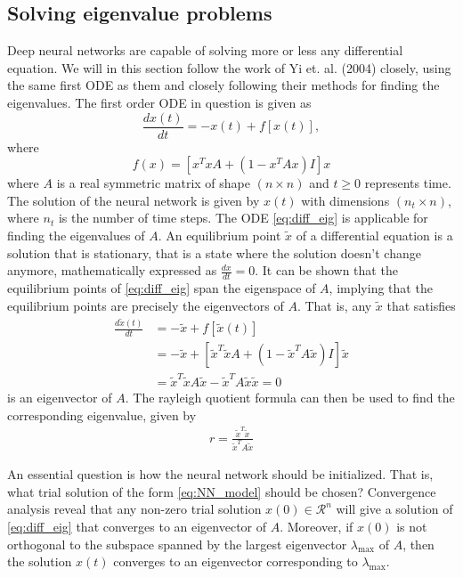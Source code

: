 \documentclass[12pt]{extarticle}
\begin{document}
\subsection{Solving eigenvalue problems}
Deep neural networks are capable of solving more or less any differential equation. We will in this section follow the work of Yi et. al. (2004) \cite{yi2004neural} closely, using the same first ODE as them and closely following their methods for finding the eigenvalues. The first order ODE in question is given as     
\begin{equation}
	\frac{dx(t)}{dt} = -x(t) + f[x(t)],
	\label{eq:diff_eig}
\end{equation}
where
\[ f(x) = [x^TxA + (1 - x^TAx)I]x \]
where $A$ is a real symmetric matrix of shape $(n\times n)$ and $t \ge 0$ represents time. The solution of the neural network is given by $x(t)$ with dimensions $(n_t\times n)$, where $n_t$ is the number of time steps. The ODE \eqref{eq:diff_eig} is applicable for finding the eigenvalues of $A$. An equilibrium point $\tilde{x}$ of a differential equation is a solution that is stationary, that is a state where the solution doesn't change anymore, mathematically expressed as $\frac{dx}{dt} = 0$. It can be shown that the equilibrium points of \eqref{eq:diff_eig} span the eigenspace of $A$, implying that the equilibrium points are precisely the eigenvectors of $A$. That is, any $\tilde{x}$ that satisfies
\begin{align*}
	\frac{d\tilde{x}(t)}{dt} &= -\tilde{x} + f[\tilde{x}(t)] \\
	&= -\tilde{x} + [\tilde{x}^T\tilde{x}A + (1 - \tilde{x}^TA\tilde{x})I]\tilde{x} \\
	&= \tilde{x}^T\tilde{x}A\tilde{x} - \tilde{x}^TA\tilde{x}\tilde{x} = 0
\end{align*}
is an eigenvector of $A$. The rayleigh quotient formula can then be used to find the corresponding eigenvalue, given by
\begin{align} \label{eq:rayleigh_quotient}
	r = \frac{\tilde{x}^T\tilde{x}}{\tilde{x}^T A \tilde{x}}
\end{align}

An essential question is how the neural network should be initialized. That is, what trial solution of the form \eqref{eq:NN_model} should be chosen? Convergence analysis reveal that any non-zero trial solution $x(0) \in \mathcal{R}^n$ will give a solution of \eqref{eq:diff_eig} that converges to an eigenvector of $A$. Moreover, if $x(0)$ is not orthogonal to the subspace spanned by the largest eigenvector $\lambda_{\mathrm{max}}$ of $A$, then the solution $x(t)$ converges to an eigenvector corresponding to $\lambda_{\mathrm{max}}$.
\end{document}
